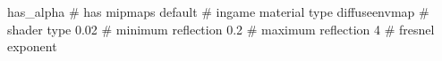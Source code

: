 has_alpha
# has mipmaps
default			 # ingame material type
diffuseenvmap            # shader type
0.02			 # minimum reflection
0.2			 # maximum reflection
4			 # fresnel exponent



